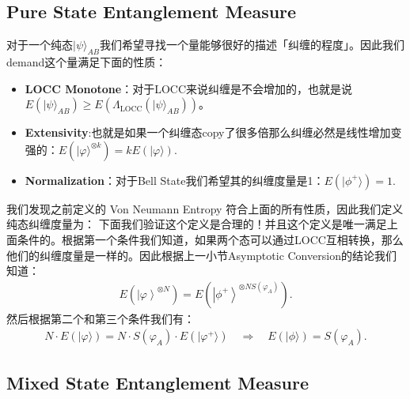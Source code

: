 \subsection{Pure State Entanglement Measure}


对于一个纯态$ |\psi\rangle_{AB} $我们希望寻找一个量能够很好的描述「纠缠的程度」。因此我们demand这个量满足下面的性质：
\begin{itemize}
  \item \textbf{LOCC Monotone}：对于LOCC来说纠缠是不会增加的，也就是说$
    E(|\psi\rangle_{AB}) \geq E(\Lambda_{\mathrm{LOCC}}(|\psi\rangle_{AB})) $。
  \item \textbf{Extensivity}:也就是如果一个纠缠态copy了很多倍那么纠缠必然是线性增加变强的：$
    E\left(|\varphi\rangle^{\otimes k}\right)=kE(|\varphi\rangle).$
  \item \textbf{Normalization}：对于Bell State我们希望其的纠缠度量是1：$ E(|\phi^+\rangle)=1. $
\end{itemize}

\bigskip
{}

我们发现之前定义的 Von Neumann Entropy 符合上面的所有性质，因此我们定义纯态纠缠度量为：
下面我们验证这个定义是合理的！并且这个定义是唯一满足上面条件的。根据第一个条件我们知道，如果两个态可以通过LOCC互相转换，那么他们的纠缠度量是一样的。因此根据上一小节Asymptotic
Conversion的结论我们知道：
\begin{align}
  E{\left(\left|\varphi\right\rangle^{\otimes
  N}\right)}=E{\left(\left|\phi^{+}\right\rangle^{\otimes
  NS\left(\varphi_{A}\right)}\right)}.
\end{align}
然后根据第二个和第三个条件我们有：
\begin{align}
  N\cdot E(|\varphi\rangle)=N\cdot S(\varphi_A)\cdot
  E(|\varphi^+\rangle) \quad \Rightarrow \quad E(|\phi\rangle)=S(\varphi_A).
\end{align}

\subsection{Mixed State Entanglement Measure}


